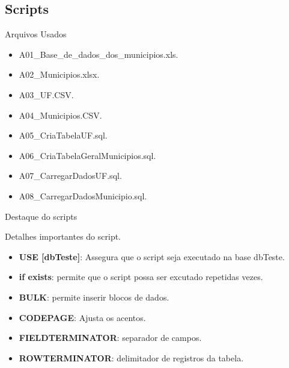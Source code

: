 	
	\subsection{Scripts}

	\begin{frame}
	
	\begin{CaixaModelo01}{Arquivos Usados}
		
	\begin{itemize}
		\item 	A01\_Base\_de\_dados\_dos\_municipios.xls.		
		\item   A02\_Municipios.xlsx.
		\item 	A03\_UF.CSV.
		\item   A04\_Municipios.CSV.
		\item 	A05\_CriaTabelaUF.sql.
		\item   A06\_CriaTabelaGeralMunicipios.sql.
		\item 	A07\_CarregarDadosUF.sql.
		\item   A08\_CarregarDadosMunicipio.sql.
	\end{itemize}
	
	\end{CaixaModelo01}
	
	\end{frame}


	\begin{frame}

\begin{CaixaModelo01}{Destaque do scripts}
	
	Detalhes importantes do script.
	
	\begin{itemize}
		\item 	\textbf{USE [dbTeste]}: Assegura que o script seja executado na base dbTeste.
		\item   \textbf{if exists}: permite que o script possa ser excutado repetidas vezes.
		\item 	\textbf{BULK}: permite inserir blocos de dados.
		\item   \textbf{CODEPAGE}: Ajusta os acentos.
		\item 	\textbf{FIELDTERMINATOR}: separador de campos.
		\item   \textbf{ROWTERMINATOR}: delimitador de registros da tabela.
	\end{itemize}
	
\end{CaixaModelo01}

\end{frame}